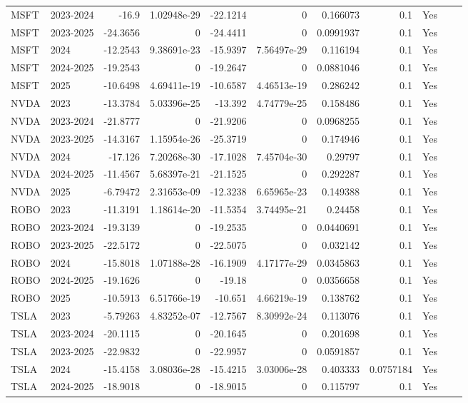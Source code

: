\begin{longtable}{llrrrrrrrrl}
MSFT & 2023-2024 & -16.9 & 1.02948e-29 & -22.1214 & 0 & 0.166073 & 0.1 & Yes \\
MSFT & 2023-2025 & -24.3656 & 0 & -24.4411 & 0 & 0.0991937 & 0.1 & Yes \\
MSFT & 2024 & -12.2543 & 9.38691e-23 & -15.9397 & 7.56497e-29 & 0.116194 & 0.1 & Yes \\
MSFT & 2024-2025 & -19.2543 & 0 & -19.2647 & 0 & 0.0881046 & 0.1 & Yes \\
MSFT & 2025 & -10.6498 & 4.69411e-19 & -10.6587 & 4.46513e-19 & 0.286242 & 0.1 & Yes \\
NVDA & 2023 & -13.3784 & 5.03396e-25 & -13.392 & 4.74779e-25 & 0.158486 & 0.1 & Yes \\
NVDA & 2023-2024 & -21.8777 & 0 & -21.9206 & 0 & 0.0968255 & 0.1 & Yes \\
NVDA & 2023-2025 & -14.3167 & 1.15954e-26 & -25.3719 & 0 & 0.174946 & 0.1 & Yes \\
NVDA & 2024 & -17.126 & 7.20268e-30 & -17.1028 & 7.45704e-30 & 0.29797 & 0.1 & Yes \\
NVDA & 2024-2025 & -11.4567 & 5.68397e-21 & -21.1525 & 0 & 0.292287 & 0.1 & Yes \\
NVDA & 2025 & -6.79472 & 2.31653e-09 & -12.3238 & 6.65965e-23 & 0.149388 & 0.1 & Yes \\
ROBO & 2023 & -11.3191 & 1.18614e-20 & -11.5354 & 3.74495e-21 & 0.24458 & 0.1 & Yes \\
ROBO & 2023-2024 & -19.3139 & 0 & -19.2535 & 0 & 0.0440691 & 0.1 & Yes \\
ROBO & 2023-2025 & -22.5172 & 0 & -22.5075 & 0 & 0.032142 & 0.1 & Yes \\
ROBO & 2024 & -15.8018 & 1.07188e-28 & -16.1909 & 4.17177e-29 & 0.0345863 & 0.1 & Yes \\
ROBO & 2024-2025 & -19.1626 & 0 & -19.18 & 0 & 0.0356658 & 0.1 & Yes \\
ROBO & 2025 & -10.5913 & 6.51766e-19 & -10.651 & 4.66219e-19 & 0.138762 & 0.1 & Yes \\
TSLA & 2023 & -5.79263 & 4.83252e-07 & -12.7567 & 8.30992e-24 & 0.113076 & 0.1 & Yes \\
TSLA & 2023-2024 & -20.1115 & 0 & -20.1645 & 0 & 0.201698 & 0.1 & Yes \\
TSLA & 2023-2025 & -22.9832 & 0 & -22.9957 & 0 & 0.0591857 & 0.1 & Yes \\
TSLA & 2024 & -15.4158 & 3.08036e-28 & -15.4215 & 3.03006e-28 & 0.403333 & 0.0757184 & Yes \\
TSLA & 2024-2025 & -18.9018 & 0 & -18.9015 & 0 & 0.115797 & 0.1 & Yes \\

\end{longtable}
